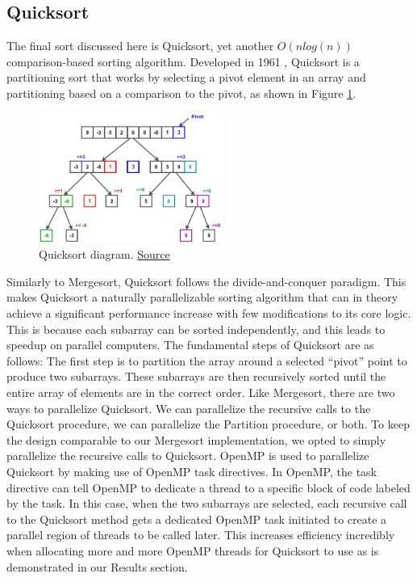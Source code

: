 \documentclass[conference]{IEEEtran}
\begin{document}
    \subsection{Quicksort}
    The final sort discussed here is Quicksort, yet another $O(nlog(n))$ comparison-based sorting algorithm.
    Developed in 1961 \cite{hoare_algorithm_1961}, Quicksort is a partitioning sort that works by selecting a pivot element in an array and partitioning based on a comparison to the pivot, as shown in Figure \ref{qck}. 
    \begin{figure}[h]
        \includegraphics[width=6cm]{Quicksort.png} 
        \caption{Quicksort diagram. \href{https://www.techiedelight.com/quicksort/}{Source}}
        \label{qck}
    \end{figure}
    Similarly to Mergesort, Quicksort follows the divide-and-conquer paradigm. This makes Quicksort a naturally parallelizable sorting algorithm that can in theory achieve a significant performance increase with few modifications to its core logic. \cite{blelloch_programming_1996}
    This is because each subarray can be sorted independently, and this leads to speedup on parallel computers.
    The fundamental steps of Quicksort are as follows: The first step is to partition the array around a selected “pivot” point to produce two subarrays. These subarrays are then recursively sorted until the entire array of elements are in the correct order. Like Mergesort, there are two ways to parallelize Quicksort.
	We can parallelize the recursive calls to the Quicksort procedure, we can parallelize the Partition procedure, or both. To keep the design comparable to our Mergesort implementation, we opted to simply parallelize the recursive calls to Quicksort. OpenMP is used to parallelize Quicksort by making use of
	OpenMP task directives. In OpenMP, the task directive can tell OpenMP to dedicate a
	thread to a specific block of code labeled by the task. In this case, when the two subarrays are selected, each recursive call to the Quicksort method gets a dedicated OpenMP task initiated to create a parallel region of threads to be called later. This increases efficiency incredibly when allocating more and more OpenMP threads for Quicksort to use as is demonstrated in our Results section.
\end{document}
